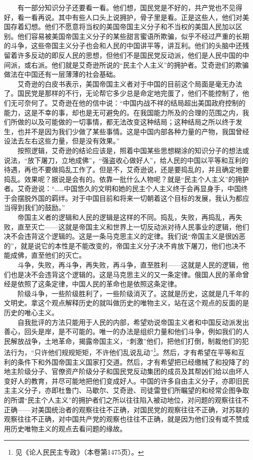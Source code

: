\documentclass[cn,11pt,chinese]{elegantbook}
\begin{document}
　　有一部分知识分子还要看一看。他们想，国民党是不好的，共产党也不见得好，看一看再说。其中有些人口头上说拥护，骨子里是看。正是这些人，他们对美国存着幻想。他们不愿意将当权的美国帝国主义分子和不当权的美国人民加以区别。他们容易被美国帝国主义分子的某些甜言蜜语所欺骗，似乎不经过严重的长期的斗争，这些帝国主义分子也会和人民的中国讲平等，讲互利。他们的头脑中还残留着许多反动的即反人民的思想，但他们不是国民党反动派，他们是人民中国的中间派，或右派。他们就是艾奇逊所说的“民主个人主义”的拥护者。艾奇逊们的欺骗做法在中国还有一层薄薄的社会基础。\\
　　艾奇逊的白皮书表示，美国帝国主义者对于中国的目前这个局面是毫无办法了。国民党是那样的不行，无论帮它多少总是命定地完蛋了，他们不能控制了，他们无可奈何了。艾奇逊在他的信中说：“中国内战不祥的结局超出美国政府控制的能力，这是不幸的事，却也是无可避免的。在我国能力所及的合理的范围之内，我们所做的以及可能做的一切事情，都无法改变这种结局；这种结局之所以终于发生，也并不是因为我们少做了某些事情。这是中国内部各种力量的产物，我国曾经设法去左右这些力量，但是没有效果。”\\
　　按照逻辑，艾奇逊的结论应该是，照着中国某些思想糊涂的知识分子的想法或说法，“放下屠刀，立地成佛”，“强盗收心做好人”，给人民的中国以平等和互利的待遇，再也不要做捣乱工作了。但是不，艾奇逊说，还是要捣乱的，并且确定地要捣乱。效果呢？据说是会有的。依靠一批什么人物呢？就是“民主个人主义”的拥护者。艾奇逊说：“……中国悠久的文明和她的民主个人主义终于会再显身手，中国终于会摆脱外国的羁绊。对于中国目前和将来一切朝着这个目标的发展，我认为都应当得到我们的鼓励。”\\
　　帝国主义者的逻辑和人民的逻辑是这样的不同。捣乱，失败，再捣乱，再失败，直至灭亡——这就是帝国主义和世界上一切反动派对待人民事业的逻辑，他们决不会违背这个逻辑的。这是一条马克思主义的定律。我们说“帝国主义是很凶恶的”，就是说它的本性是不能改变的，帝国主义分子决不肯放下屠刀，他们也决不能成佛，直至他们的灭亡。\\
　　斗争，失败，再斗争，再失败，再斗争，直至胜利——这就是人民的逻辑，他们也是决不会违背这个逻辑的。这是马克思主义的又一条定律。俄国人民的革命曾经是依照了这条定律，中国人民的革命也是依照这条定律。\\
　　阶级斗争，一些阶级胜利了，一些阶级消灭了。这就是历史，这就是几千年的文明史。拿这个观点解释历史的就叫做历史的唯物主义，站在这个观点的反面的是历史的唯心主义。\\
　　自我批评的方法只能用于人民的内部，希望劝说帝国主义者和中国反动派发出善心，回头是岸，是不可能的。唯一的办法是组织力量和他们斗争，例如我们的人民解放战争，土地革命，揭露帝国主义，“刺激”他们，把他们打倒，制裁他们的犯法行为，“只许他们规规矩矩，不许他们乱说乱动”\footnote[9]{ 见《论人民民主专政》（本卷第1475页）。}。然后，才有希望在平等和互利的条件下和外国帝国主义国家打交道。然后，才有希望把已经缴械了和投降了的地主阶级分子、官僚资产阶级分子和国民党反动集团的成员及其帮凶们给以由坏人变好人的教育，并尽可能地把他们变成好人。中国的许多自由主义分子，亦即旧民主主义分子，亦即杜鲁门、马歇尔、艾奇逊、司徒雷登们所瞩望的和经常企图争取的所谓“民主个人主义”的拥护者们之所以往往陷入被动地位，对问题的观察往往不正确——对美国统治者的观察往往不正确，对国民党的观察往往不正确，对苏联的观察往往不正确，对中国共产党的观察也往往不正确，就是因为他们没有或不赞成用历史唯物主义的观点去看问题的缘故。\\
\end{document}
